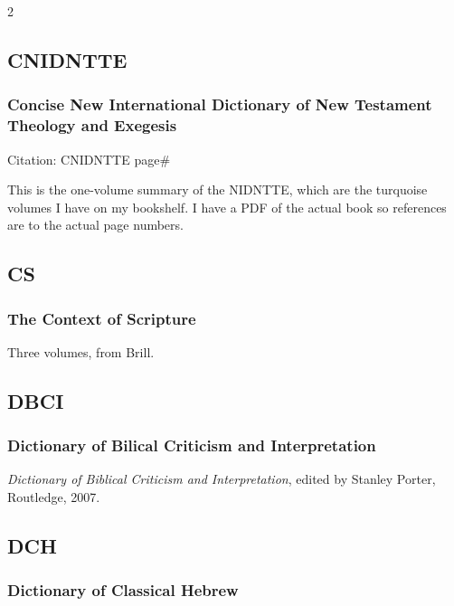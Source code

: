 \begin{multicols}{2}
	\subsection*{CNIDNTTE}
	
		\subsubsection*{Concise New International Dictionary of New Testament Theology and Exegesis}
		
			Citation:
				CNIDNTTE page\#
		
			This is the one-volume summary of the NIDNTTE, which are the turquoise volumes I have on my bookshelf. I have a PDF of the actual book so references are to the actual page numbers.
			
	\subsection*{CS}
	
		\subsubsection*{The Context of Scripture}
		
			Three volumes, from Brill.
			
	\subsection*{DBCI}
	
		\subsubsection*{Dictionary of Bilical Criticism and Interpretation}
		
			\textit{Dictionary of Biblical Criticism and Interpretation}, edited by Stanley Porter, Routledge, 2007.
			
	\subsection*{DCH}
	
		\subsubsection*{Dictionary of Classical Hebrew}
		

\end{multicols}
